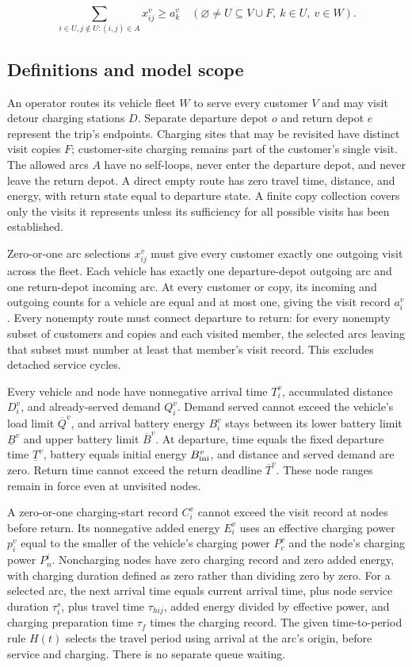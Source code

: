 \documentclass[10pt]{article}
\begin{document}
\[
\sum_{i\in U,j\notin U:(i,j)\in A}x_{ij}^v\ge a_k^v
\quad(\varnothing\ne U\subseteq V\cup F,\ k\in U,\ v\in W).
\]

\subsection*{Definitions and model scope}
An operator routes its vehicle fleet $W$ to serve every customer $V$ and may visit detour charging stations $D$. Separate departure depot $o$ and return depot $e$ represent the trip's endpoints. Charging sites that may be revisited have distinct visit copies $F$; customer-site charging remains part of the customer's single visit. The allowed arcs $A$ have no self-loops, never enter the departure depot, and never leave the return depot. A direct empty route has zero travel time, distance, and energy, with return state equal to departure state. A finite copy collection covers only the visits it represents unless its sufficiency for all possible visits has been established.

Zero-or-one arc selections $x_{ij}^v$ must give every customer exactly one outgoing visit across the fleet. Each vehicle has exactly one departure-depot outgoing arc and one return-depot incoming arc. At every customer or copy, its incoming and outgoing counts for a vehicle are equal and at most one, giving the visit record $a_i^v$. Every nonempty route must connect departure to return: for every nonempty subset of customers and copies and each visited member, the selected arcs leaving that subset must number at least that member's visit record. This excludes detached service cycles.

Every vehicle and node have nonnegative arrival time $T_i^v$, accumulated distance $D_i^v$, and already-served demand $Q_i^v$. Demand served cannot exceed the vehicle's load limit $\overline Q^v$, and arrival battery energy $B_i^v$ stays between its lower battery limit $\underline B^v$ and upper battery limit $\overline B^v$. At departure, time equals the fixed departure time $\underline T^v$, battery equals initial energy $B_{\rm ini}^v$, and distance and served demand are zero. Return time cannot exceed the return deadline $\overline T^v$. These node ranges remain in force even at unvisited nodes.

A zero-or-one charging-start record $C_i^v$ cannot exceed the visit record at nodes before return. Its nonnegative added energy $E_i^v$ uses an effective charging power $p_i^v$ equal to the smaller of the vehicle's charging power $P_c^v$ and the node's charging power $P_n^i$. Noncharging nodes have zero charging record and zero added energy, with charging duration defined as zero rather than dividing zero by zero. For a selected arc, the next arrival time equals current arrival time, plus node service duration $\tau_i^s$, plus travel time $\tau_{hij}$, added energy divided by effective power, and charging preparation time $\tau_f$ times the charging record. The given time-to-period rule $H(t)$ selects the travel period using arrival at the arc's origin, before service and charging. There is no separate queue waiting.
\end{document}
